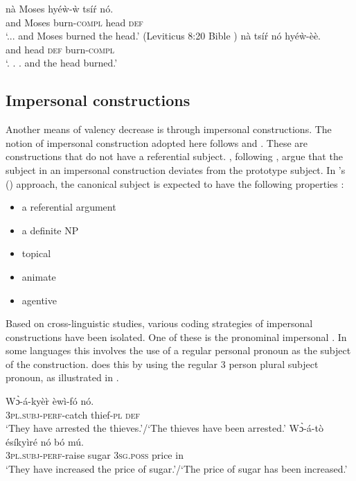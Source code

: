 \documentclass[output=paper]{langsci/langscibook}
\begin{document}
\ea\label{ex:34.osam}
\ea\label{ex:34a.osam}
\gll nà  Moses    hyéẁ-ẁ   tsíŕ  nó.\\
       and   Moses     burn-\textsc{compl}  head  \textsc{def}\\
\glt `...  and Moses burned the head.' (Leviticus 8:20  Bible \citep{bible1974})
\ex\label{ex:34b.osam}
\gll  nà  tsíŕ   nó  hyéẁ-èè.\\
       and  head  \textsc{def}  burn-\textsc{compl}  \\
\glt `. .  . and the head burned.'
\z 
\z 


\subsection{Impersonal constructions}\label{§4.4:impersonal.osam}

Another means of valency decrease is through impersonal constructions. The notion of impersonal construction adopted here follows \citet{siewierska2008,siewierska2011} and \citet{malchukovogawa2011}. These are constructions that do not have a referential subject. \citet{malchukovogawa2011}, following \citet{keenan1976}, argue that the subject in an impersonal construction deviates from the prototype subject. In \citeauthor{keenan1976}'s (\citeyear{keenan1976}) approach, the canonical subject is expected to have the following properties \citep[23]{malchukovogawa2011}:

\begin{itemize}
 \item  a referential argument
 \item a definite NP
 \item topical
 \item animate
 \item  agentive
\end{itemize}


Based on cross-linguistic studies, various coding strategies of impersonal constructions have been isolated. One of these is the pronominal impersonal \citep{siewierska2011}. In some languages this involves the use of a regular personal pronoun as the subject of the construction.  does this by using the regular 3 person plural subject pronoun, as illustrated in .

\ea\label{ex:35.osam}
\ea\label{ex:35a.osam}
\gll  Wɔ̀-á-kyè\`{r}    èwì-fó    nó.\\
       \textsc{3pl.subj}-\textsc{perf}-catch  thief-\textsc{pl}  \textsc{def}\\
\glt `They have arrested the thieves.'/`The thieves have been arrested.'
\ex\label{ex:35b.osam}
\gll   Wɔ̀-á-tò    ésíkyìré  nó    bó  mú.\\
       \textsc{3pl.subj}-\textsc{perf}-raise  sugar    \textsc{3sg.poss}  price  in\\
\glt   `They have increased the price of sugar.'/`The price of sugar has been increased.'
\z 
\z 
\end{document}
